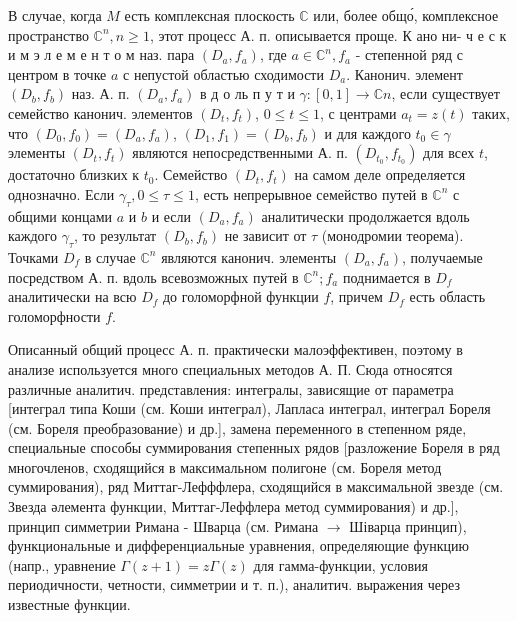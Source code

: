 \documentclass[10pt]{article}
\begin{document}
В случае, когда $M$ есть комплексная плоскость $\mathbb{C}$ или, более общо́, комплексное пространство $\mathbb{C}^{n}, n \geqslant 1$, этот процесс А. п. описывается проще. $К$ ано ни- ч е с к и м э л е м е н т о м наз. пара $\left(D_{a}, f_{a}\right)$, где $a \in \mathbb{C}^{n}, f_{a}$ - степенной ряд с центром в точке $a$ с непустой областью сходимости $D_{a}$. Канонич. элемент $\left(D_{b}, f_{b}\right)$ наз. А. п. $\left(D_{a}, f_{a}\right)$ в д о ль п у т и $\gamma:[0,1] \rightarrow \mathbb{C} n$, если существует семейство канонич. элементов $\left(D_{t}, f_{t}\right)$, $0 \leqslant t \leqslant 1$, с центрами $a_{t}=z(t)$ таких, что $\left(D_{0}, f_{0}\right)=\left(D_{a}, f_{a}\right)$, $\left(D_{1}, f_{1}\right)=\left(D_{b}, f_{b}\right)$ и для каждого $t_{0} \in \gamma$ элементы $\left(D_{t}, f_{t}\right)$ являются непосредственными А. п. $\left(D_{t_{0}}, f_{t_{0}}\right)$ для всех $t$, достаточно близких к $t_{0}$. Семейство $\left(D_{t}, f_{t}\right)$ на самом деле определяется однозначно. Если $\gamma_{\tau}, 0 \leqslant \tau \leqslant 1$, есть непрерывное семейство путей в $\mathbb{C}^{n}$ с общими концами $a$ и $b$ и если $\left(D_{a}, f_{a}\right)$ аналитически продолжается вдоль каждого $\gamma_{\tau}$, то результат $\left(D_{b}, f_{b}\right)$ не зависит от $\tau$ (монодромии теорема). Точками $D_{f}$ в случае $\mathbb{C}^{n}$ являются канонич. элементы $\left(D_{a}, f_{a}\right)$, получаемые посредством А. п. вдоль всевозможных путей в $\mathbb{C}^{n} ; f_{a}$ поднимается в $D_{f}$ аналитически на всю $D_{f}$ до голоморфной функции $f$, причем $D_{f}$ есть область голоморфности $f$.



Описанный общий процесс А. п. практически малоэффективен, поэтому в анализе используется много специальных методов А. П. Сюда относятся различные аналитич. представления: интегралы, зависящие от параметра [интеграл типа Коши (см. Коши интеграл), Лапласа интеграл, интеграл Бореля (см. Бореля преобразование) и др.], замена переменного в степенном ряде, специальные способы суммирования степенных рядов [разложение Бореля в ряд многочленов, сходящийся в максимальном полигоне (см. Бореля метод суммирования), ряд Миттаг-Лефффлера, сходящийся в максимальной звезде (см. Звезда әлемента функции, Миттаг-Леффлера метод суммирования) и др.], принцип симметрии Римана - Шварца (см. Римана $\rightarrow$ Шіварца принцип), функциональные и дифференциальные уравнения, определяющие функцию (напр., уравнение $\Gamma(z+1)=z \Gamma(z)$ для гамма-функции, условия периодичности, четности, симметрии и т. п.), аналитич. выражения через известные функции.
\end{document}
